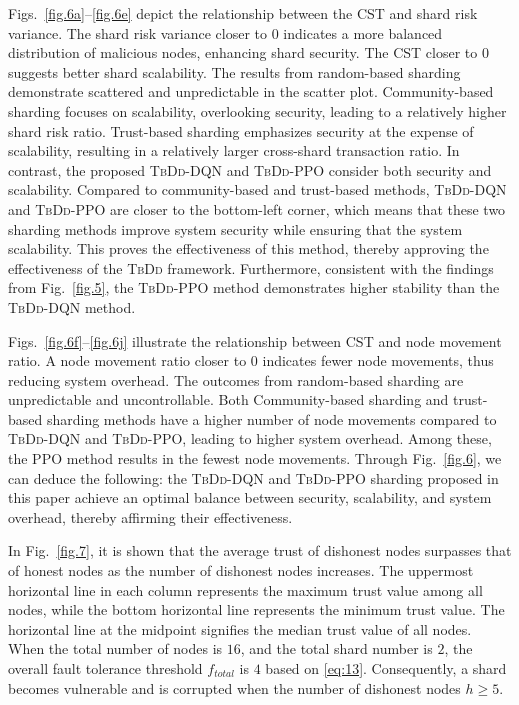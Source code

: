 Figs.~\ref{fig.6a}--\ref{fig.6e} depict the relationship between the CST and shard risk variance. The shard risk variance closer to $0$ indicates a more balanced distribution of malicious nodes, enhancing shard security. The CST closer to $0$ suggests better shard scalability. The results from random-based sharding demonstrate scattered and unpredictable in the scatter plot. Community-based sharding focuses on scalability, overlooking security, leading to a relatively higher shard risk ratio. Trust-based sharding emphasizes security at the expense of scalability, resulting in a relatively larger cross-shard transaction ratio. In contrast, the proposed \textsc{\textsc{TbDd}-DQN} and \textsc{\textsc{TbDd}-PPO} consider both security and scalability. Compared to community-based and trust-based methods, \textsc{\textsc{TbDd}-DQN} and \textsc{\textsc{TbDd}-PPO} are closer to the bottom-left corner, which means that these two sharding methods improve system security while ensuring that the system scalability. This proves the effectiveness of this method, thereby approving the effectiveness of the \textsc{TbDd} framework. Furthermore, consistent with the findings from Fig.~\ref{fig.5}, the \textsc{\textsc{TbDd}-PPO} method demonstrates higher stability than the \textsc{\textsc{TbDd}-DQN} method.


Figs.~\ref{fig.6f}--\ref{fig.6j} illustrate the relationship between CST and node movement ratio. A node movement ratio closer to $0$ indicates fewer node movements, thus reducing system overhead. The outcomes from random-based sharding are unpredictable and uncontrollable. Both Community-based sharding and trust-based sharding methods have a higher number of node movements compared to \textsc{TbDd}-DQN and \textsc{TbDd}-PPO, leading to higher system overhead. Among these, the PPO method results in the fewest node movements. Through Fig.~\ref{fig.6}, we can deduce the following: the \textsc{TbDd}-DQN and \textsc{TbDd}-PPO sharding proposed in this paper achieve an optimal balance between security, scalability, and system overhead, thereby affirming their effectiveness.



In Fig.~\ref{fig.7}, it is shown that the average trust of dishonest nodes surpasses that of honest nodes as the number of dishonest nodes increases. The uppermost horizontal line in each column represents the maximum trust value among all nodes, while the bottom horizontal line represents the minimum trust value. The horizontal line at the midpoint signifies the median trust value of all nodes. When the total number of nodes is $16$, and the total shard number is $2$, the overall fault tolerance threshold $f_{total}$ is $4$ based on \eqref{eq:13}. Consequently, a shard becomes vulnerable and is corrupted when the number of dishonest nodes $h \geq 5$.


